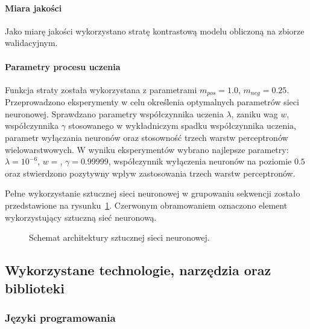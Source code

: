             \paragraph{Miara jakości}
                Jako miarę jakości wykorzystano stratę kontrastową modelu obliczoną na zbiorze walidacyjnym.

            \paragraph{Parametry procesu uczenia}
                Funkcja straty została wykorzystana z parametrami $m_{pos} = 1.0$, $m_{neg} = 0.25$.
                Przeprowadzono eksperymenty w celu określenia optymalnych parametrów sieci neuronowej. Sprawdzano parametry współczynnika uczenia $\lambda$, zaniku wag $w$, współczynnika $\gamma$ stosowanego w wykładniczym spadku współczynnika uczenia, parametr wyłączania neuronów oraz stosowność trzech warstw perceptronów wielowarstwowych. 
                W wyniku eksperymentów wybrano najlepsze parametry: $\lambda = 10^{-6}$, $w = $, $\gamma=0.99999$, współczynnik wyłączenia neuronów na poziomie $0.5$ oraz stwierdzono pozytywny wpływ zastosowania trzech warstw perceptronów. 

            Pełne wykorzystanie sztucznej sieci neuronowej w grupowaniu sekwencji zostało przedstawione na rysunku~\ref{Picture:Cluster:Neural}. Czerwonym obramowaniem oznaczono element wykorzystujący sztuczną sieć neuronową.

            \begin{figure}
                \begin{center}
                    
                \end{center}
                \caption{
                    Schemat architektury sztucznej sieci neuronowej.
                }\label{Picture:Cluster:Neural}
            \end{figure}

    \subsection{Wykorzystane technologie, narzędzia oraz biblioteki}

        \subsubsection{Języki programowania}

